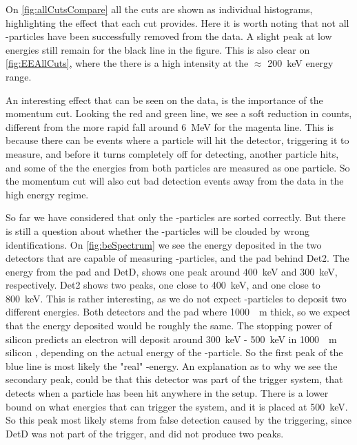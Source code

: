 On \cref{fig:allCutsCompare} all the cuts are shown as individual histograms, highlighting the effect that each cut provides. Here it is worth noting that not all \be-particles have been successfully removed from the data. A slight peak at low energies still remain for the black line in the figure. This is also clear on \cref{fig:EEAllCuts}, where the there is a high intensity at the $\approx$ \SI{200}{keV} energy range. 

An interesting effect that can be seen on the data, is the importance of the momentum cut. Looking the red and green line, we see a soft reduction in counts, different from the more rapid fall around \SI{6}{MeV} for the magenta line. This is because there can be events where a particle will hit the detector, triggering it to measure, and before it turns completely off for detecting, another particle hits, and some of the the energies from both particles are measured as one particle. 
So the momentum cut will also cut bad detection events away from the data in the high energy regime. 



So far we have considered that only the \al-particles are sorted correctly. But there is still a question about whether the \be-particles will be clouded by wrong identifications. 
On \cref{fig:beSpectrum} we see the energy deposited in the two detectors that are capable of measuring \be-particles, and the pad behind Det2.
The energy from the pad and DetD, shows one peak around \SI{400}{keV} and \SI{300}{keV}, respectively. 
Det2 shows two peaks, one close to \SI{400}{keV}, and one close to \SI{800}{keV}. This is rather interesting, as we do not expect \be-particles to deposit two different energies. Both detectors and the pad where \SI{1000}{\mu m} thick, so we expect that the energy deposited would be roughly the same. The stopping power of silicon predicts an electron will deposit around \SI{300}{keV} - \SI{500}{keV} in \SI{1000}{\mu m} silicon \cite{NIST_ASD}, depending on the actual energy of the \be-particle. So the first peak of the blue line is most likely the "real" \be-energy. 
An explanation as to why we see the secondary peak, could be that this detector was part of the trigger system, that detects when a particle has been hit anywhere in the setup. There is a lower bound on what energies that can trigger the system, and it is placed at \SI{500}{keV}. 
So this peak most likely stems from false detection caused by the triggering, since DetD was not part of the trigger, and did not produce two peaks.

